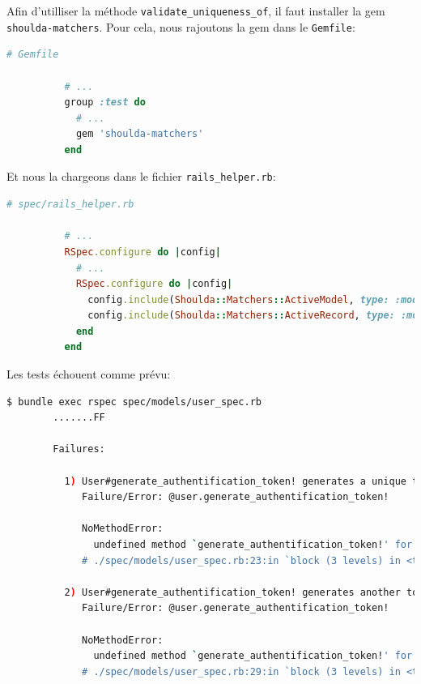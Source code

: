 \documentclass[]{report}
\begin{document}
      \begin{tcolorbox}
        Afin d'utilliser la méthode \verb|validate_uniqueness_of|, il faut installer la gem \verb|shoulda-matchers|. Pour cela, nous rajoutons la gem dans le \verb|Gemfile|:

        \begin{scriptsize}
          \begin{lstlisting}[language=ruby]
          # Gemfile

          # ...
          group :test do
            # ...
            gem 'shoulda-matchers'
          end
          \end{lstlisting}
        \end{scriptsize}

        Et nous la chargeons dans le fichier \verb|rails_helper.rb|:

        \begin{scriptsize}
          \begin{lstlisting}[language=ruby]
          # spec/rails_helper.rb

          # ...
          RSpec.configure do |config|
            # ...
            RSpec.configure do |config|
              config.include(Shoulda::Matchers::ActiveModel, type: :model)
              config.include(Shoulda::Matchers::ActiveRecord, type: :model)
            end
          end
          \end{lstlisting}
        \end{scriptsize}
      \end{tcolorbox}

      Les tests échouent comme prévu:

      \begin{scriptsize}
        \begin{lstlisting}[language=bash]
        $ bundle exec rspec spec/models/user_spec.rb
        .......FF

        Failures:

          1) User#generate_authentification_token! generates a unique token
             Failure/Error: @user.generate_authentification_token!

             NoMethodError:
               undefined method `generate_authentification_token!' for #<User:0x0000558948d23760>
             # ./spec/models/user_spec.rb:23:in `block (3 levels) in <top (required)>'

          2) User#generate_authentification_token! generates another token when one already has been taken
             Failure/Error: @user.generate_authentification_token!

             NoMethodError:
               undefined method `generate_authentification_token!' for #<User:0x0000558948d18720>
             # ./spec/models/user_spec.rb:29:in `block (3 levels) in <top (required)>'
        \end{lstlisting}
      \end{scriptsize}
\end{document}
